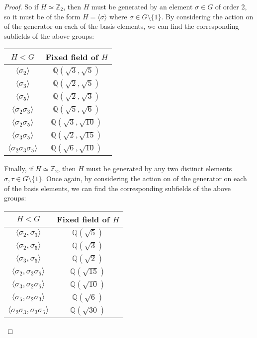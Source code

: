 \documentclass{article}
\begin{document}
\begin{proof}
    So if $H\simeq\mathbb{Z}_2$, then $H$ must be generated by an
    element $\sigma\in G$ of order 2, so it must be of the form
    $H=\langle\sigma\rangle$ where $\sigma\in G\setminus\{1\}$. By
    considering the action on of the generator on each of the basis
    elements, we can find the corresponding subfields of the above groups:
    \begin{table}[h]
      \centering
      \begin{tabular}{c|c}
        $H<G$ & Fixed field of $H$ \\
        \hline
        $\langle \sigma_2\rangle$ &$\mathbb{Q}(\sqrt{3},\sqrt{5})$\\
        $\langle \sigma_3\rangle$ &$\mathbb{Q}(\sqrt{2},\sqrt{5})$\\
        $\langle \sigma_5\rangle$ &$\mathbb{Q}(\sqrt{2},\sqrt{3})$\\
        $\langle \sigma_2\sigma_3\rangle$ &$\mathbb{Q}(\sqrt{5},\sqrt{6})$\\
        $\langle \sigma_2\sigma_5\rangle$ &$\mathbb{Q}(\sqrt{3},\sqrt{10})$\\
        $\langle \sigma_3\sigma_5\rangle$ &$\mathbb{Q}(\sqrt{2},\sqrt{15})$\\
        $\langle \sigma_2\sigma_3\sigma_5\rangle$
          &$\mathbb{Q}(\sqrt{6},\sqrt{10})$ \\
      \end{tabular}
    \end{table}

    Finally, if $H\simeq\mathbb{Z}_2$, then $H$ must be generated by any
    two distinct elements $\sigma,\tau\in G\setminus\{1\}$. Once again, by
    considering the action on of the generator on each of the basis
    elements, we can find the corresponding subfields of the above groups:
    \begin{table}[h]
      \centering
      \begin{tabular}{c|c}
        $H<G$ & Fixed field of $H$ \\
        \hline
        $\langle \sigma_2,\sigma_3\rangle$ &$\mathbb{Q}(\sqrt{5})$\\
        $\langle \sigma_2,\sigma_5\rangle$ &$\mathbb{Q}(\sqrt{3})$\\
        $\langle \sigma_3,\sigma_5\rangle$ &$\mathbb{Q}(\sqrt{2})$\\
        $\langle \sigma_2,\sigma_3\sigma_5\rangle$ &$\mathbb{Q}(\sqrt{15})$\\
        $\langle \sigma_3,\sigma_2\sigma_5\rangle$ &$\mathbb{Q}(\sqrt{10})$\\
        $\langle \sigma_5,\sigma_2\sigma_3\rangle$ &$\mathbb{Q}(\sqrt{6})$\\
        $\langle \sigma_2\sigma_3,\sigma_3\sigma_5\rangle$
          &$\mathbb{Q}(\sqrt{30})$\\
      \end{tabular}
    \end{table}
  \end{proof}
\end{document}
